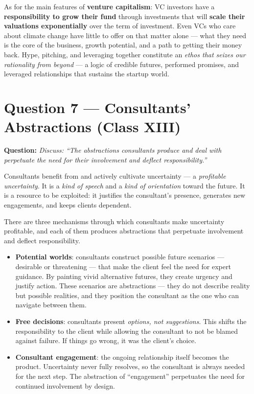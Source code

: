 \documentclass[11pt,a4paper]{article}
\begin{document}
As for the main features of \textbf{venture capitalism}: VC investors have a \textbf{responsibility to grow their fund} through investments that will \textbf{scale their valuations exponentially} over the term of investment. Even VCs who care about climate change have little to offer on that matter alone --- what they need is the core of the business, growth potential, and a path to getting their money back. Hype, pitching, and leveraging together constitute an \textit{ethos that seizes our rationality from beyond} --- a logic of credible futures, performed promises, and leveraged relationships that sustains the startup world.

\section*{Question 7 --- Consultants' Abstractions (Class XIII)}

\textbf{Question:} \textit{Discuss: ``The abstractions consultants produce and deal with perpetuate the need for their involvement and deflect responsibility.''}

Consultants benefit from and actively cultivate uncertainty --- a \emph{profitable uncertainty}. It is a \textit{kind of speech} and a \textit{kind of orientation} toward the future. It is a resource to be exploited: it justifies the consultant's presence, generates new engagements, and keeps clients dependent.

There are three mechanisms through which consultants make uncertainty profitable, and each of them produces abstractions that perpetuate involvement and deflect responsibility.
\begin{itemize}
	\item \textbf{Potential worlds}: consultants construct possible future scenarios --- desirable or threatening --- that make the client feel the need for expert guidance. By painting vivid alternative futures, they create urgency and justify action. These scenarios are abstractions --- they do not describe reality but possible realities, and they position the consultant as the one who can navigate between them.
	\item \textbf{Free decisions}: consultants present \textit{options, not suggestions}. This shifts the responsibility to the client while allowing the consultant to not be blamed against failure. If things go wrong, it was the client's choice.
	\item \textbf{Consultant engagement}: the ongoing relationship itself becomes the product. Uncertainty never fully resolves, so the consultant is always needed for the next step. The abstraction of ``engagement'' perpetuates the need for continued involvement by design.
\end{itemize}
\end{document}
